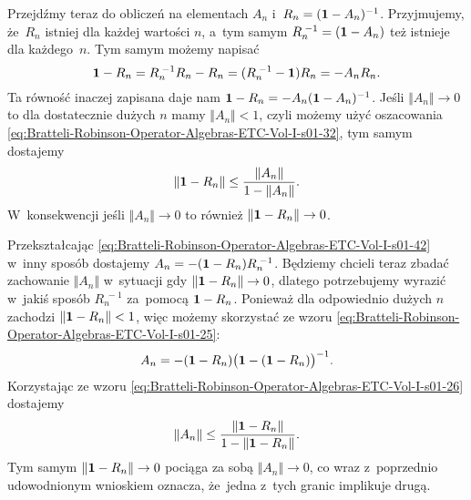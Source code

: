 \documentclass[a4paper,11pt]{article}
\begin{document}
Przejdźmy teraz do obliczeń na elementach $A_{ n }$
i~$R_{ n } = ( \mathbf{1} - A_{ n } )^{ -1 }$. Przyjmujemy, że~$R_{ n }$ istniej
dla każdej wartości $n$, a~tym samym
$R_{ n }^{ \; -1 } = ( \mathbf{1} - A_{ n } )$ też istnieje dla każdego~$n$. Tym
samym możemy napisać
\begin{equation}
  \label{eq:Bratteli-Robinson-Operator-Algebras-ETC-Vol-I-s01-42}
  \mathbf{1} - R_{ n } = R_{ n }^{ \; -1 } R_{ n } - R_{ n } =
  ( R_{ n }^{ \; -1 } - \mathbf{1} ) R_{ n } =
  -A_{ n } R_{ n }.
\end{equation}
Ta równość inaczej zapisana daje nam
$\mathbf{1} - R_{ n } = -A_{ n } ( \mathbf{1} - A_{ n } )^{ -1 }$. Jeśli
$\Vert A_{ n } \Vert \to 0$ to dla dostatecznie dużych $n$ mamy $\Vert A_{ n } \Vert < 1$,
czyli możemy użyć oszacowania
\eqref{eq:Bratteli-Robinson-Operator-Algebras-ETC-Vol-I-s01-32}, tym samym
dostajemy
\begin{equation}
  \label{eq:Bratteli-Robinson-Operator-Algebras-ETC-Vol-I-s01-43}
  \Vert \mathbf{1} - R_{ n } \Vert \leq
  \frac{ \Vert A_{ n } \Vert }{ 1 - \Vert A_{ n } \Vert }.
\end{equation}
W~konsekwencji jeśli $\Vert A_{ n } \Vert \to 0$ to również
$\Vert \mathbf{1} - R_{ n } \Vert \to 0$.

Przekształcając
\eqref{eq:Bratteli-Robinson-Operator-Algebras-ETC-Vol-I-s01-42} w~inny
sposób dostajemy $A_{ n } = -( \mathbf{1} - R_{ n } ) R_{ n }^{ \; -1 }$. Będziemy
chcieli teraz zbadać zachowanie $\Vert A_{ n } \Vert$ w~sytuacji gdy
$\Vert \mathbf{1} - R_{ n } \Vert \to 0$, dlatego potrzebujemy wyrazić w~jakiś sposób
$R_{ n }^{ \; - 1 }$ za~pomocą $\mathbf{1} - R_{ n }$. Ponieważ dla
odpowiednio dużych $n$ zachodzi
$\Vert \mathbf{1} - R_{ n } \Vert < 1$, więc możemy skorzystać ze wzoru
\eqref{eq:Bratteli-Robinson-Operator-Algebras-ETC-Vol-I-s01-25}:
\begin{equation}
  \label{eq:Bratteli-Robinson-Operator-Algebras-ETC-Vol-I-s01-44}
  A_{ n } =
  -( \mathbf{1} - R_{ n } )
  \big( \mathbf{1} - ( \mathbf{1} - R_{ n } ) \big)^{ -1 }.
\end{equation}
Korzystając ze wzoru
\eqref{eq:Bratteli-Robinson-Operator-Algebras-ETC-Vol-I-s01-26} dostajemy
\begin{equation}
  \label{eq:Bratteli-Robinson-Operator-Algebras-ETC-Vol-I-s01-45}
  \Vert A_{ n } \Vert \leq
  \frac{ \Vert \mathbf{1} - R_{ n } \Vert }{ 1 - \Vert \mathbf{1} - R_{ n } \Vert }.
\end{equation}
Tym samym $\Vert \mathbf{1} - R_{ n } \Vert \to 0$ pociąga za sobą $\Vert A_{ n } \Vert \to 0$, co
wraz z~poprzednio udowodnionym wnioskiem oznacza, że~jedna z~tych granic
implikuje drugą.
\end{document}
